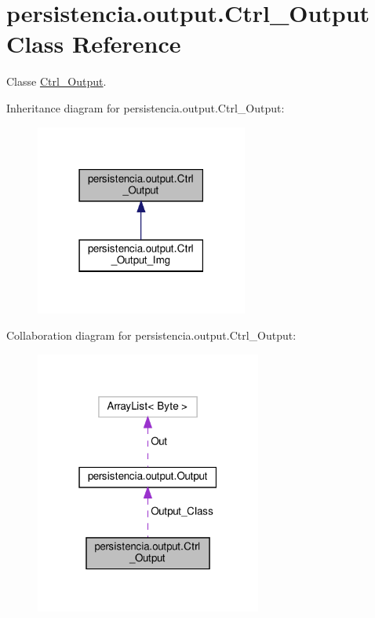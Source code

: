 \hypertarget{classpersistencia_1_1output_1_1Ctrl__Output}{}\section{persistencia.\+output.\+Ctrl\+\_\+\+Output Class Reference}
\label{classpersistencia_1_1output_1_1Ctrl__Output}


Classe \hyperlink{classpersistencia_1_1output_1_1Ctrl__Output}{Ctrl\+\_\+\+Output}.  




Inheritance diagram for persistencia.\+output.\+Ctrl\+\_\+\+Output\+:\nopagebreak
\begin{figure}[H]
\begin{center}
\leavevmode
\includegraphics[width=198pt]{classpersistencia_1_1output_1_1Ctrl__Output__inherit__graph}
\end{center}
\end{figure}


Collaboration diagram for persistencia.\+output.\+Ctrl\+\_\+\+Output\+:\nopagebreak
\begin{figure}[H]
\begin{center}
\leavevmode
\includegraphics[width=211pt]{classpersistencia_1_1output_1_1Ctrl__Output__coll__graph}
\end{center}
\end{figure}
